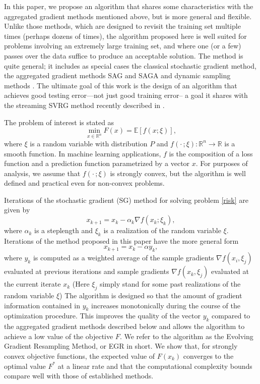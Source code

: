 \documentclass[11pt]{article}
\begin{document}
In this paper, we propose an algorithm that shares some characteristics with the aggregated gradient methods mentioned above, but is more general and flexible. Unlike those methods, which are designed to revisit the training set multiple times (perhaps dozens of times), the algorithm proposed here is well suited for problems involving an extremely large training set, and where one (or a few) passes over the data suffice to produce an acceptable solution. The method is quite general; it includes as special cases  the classical stochastic gradient method, the aggregated gradient methods SAG \cite{NIPS2014_5258} and SAGA \cite{NIPS2014_5258} and  dynamic sampling methods \cite{dss,FS2011,2014pasglyetal}. The ultimate goal of this work is the design of an algorithm that achieves good testing error---not just good training error-- a goal it shares with the streaming SVRG method recently described in \cite{frostig2014competing}.


The problem of interest is stated as
\begin{equation}  \label{risk}
	\min_{x \in \mathbb{R}^n} F(x) = \mathbb{E}[ f(x;\xi)] ,
\end{equation}
where $\xi$ is a random variable with distribution $P$ and $f(\cdot\,; \xi): \mathbb{R}^n \rightarrow \mathbb{R}$  is a smooth function. In machine learning applications, $f$ is the composition of a  loss function and a prediction function parametrized by a vector $x$. 
For purposes of analysis, we assume that $f(\cdot\,; \xi)$ is strongly convex, but the algorithm is well defined and practical even for non-convex problems. 

Iterations of the stochastic gradient (SG) method for solving problem \eqref{risk} are given by 
\begin{equation}   \label{sgdm}
 x_{k+1} = x_k- \alpha_k  \nabla f(x_k; \xi_k), 
 \end{equation}
where $\alpha_k$ is a steplength and $\xi_k$ is a realization of the random variable $\xi$. Iterations of the method proposed in this paper have the more general form
\begin{equation}   \label{iteration}
   	 x_{k+1} = x_k  - \alpha  y_k ,
\end{equation}
where $y_k$ is computed as a weighted average of the sample gradients $\nabla f(x_i, \xi_j)$ evaluated at previous iterations and sample gradients $\nabla f(x_k, \xi_j)$ evaluated at the current iterate $x_k$ (Here $\xi_j$ simply stand for some past realizations of the random variable $\xi$) The algorithm is designed so that the amount of gradient information contained in $y_k$ increases monotonically during the course of the optimization procedure. This improves the quality of the vector $y_k$ compared to the aggregated gradient methods described below and allows the algorithm to achieve a low  value of the objective $F$. We refer to the algorithm as the Evolving Gradient Resampling Method, or EGR in short. We show that, for strongly convex objective functions, the expected value of $F(x_k)$ converges to the optimal value  $F^\ast$ at a linear rate and that the computational complexity bounds compare well with those of established methods.  
\end{document}
